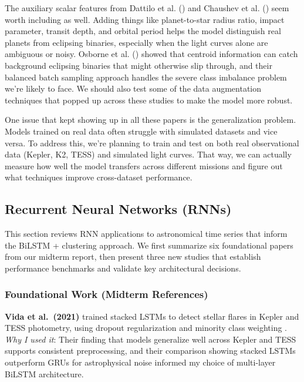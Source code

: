 \documentclass[letterpaper]{article} %
\begin{document}
The auxiliary scalar features from Dattilo et al. (\citeyear{Dattilo2019identifyexoplanetsII}) and Chaushev et al. (\citeyear{Chaushev2019ngts}) seem worth including as well. Adding things like planet-to-star radius ratio, impact parameter, transit depth, and orbital period helps the model distinguish real planets from eclipsing binaries, especially when the light curves alone are ambiguous or noisy. Osborne et al. (\citeyear{Osborn2019rapidclassificationtesscandidates}) showed that centroid information can catch background eclipsing binaries that might otherwise slip through, and their balanced batch sampling approach handles the severe class imbalance problem we're likely to face. We should also test some of the data augmentation techniques that popped up across these studies to make the model more robust.

One issue that kept showing up in all these papers is the generalization problem. Models trained on real data often struggle with simulated datasets and vice versa. To address this, we're planning to train and test on both real observational data (Kepler, K2, TESS) and simulated light curves. That way, we can actually measure how well the model transfers across different missions and figure out what techniques improve cross-dataset performance.

\subsection{Recurrent Neural Networks (RNNs)}

This section reviews RNN applications to astronomical time series that inform the BiLSTM + clustering approach. We first summarize six foundational papers from our midterm report, then present three new studies that establish performance benchmarks and validate key architectural decisions.

\subsubsection{Foundational Work (Midterm References)}

\textbf{Vida et al.\ (2021)} trained stacked LSTMs to detect stellar flares in Kepler and TESS photometry, using dropout regularization and minority class weighting \cite{Vida2021findingflaresrecurrent}. \textit{Why I used it}: Their finding that models generalize well across Kepler and TESS supports consistent preprocessing, and their comparison showing stacked LSTMs outperform GRUs for astrophysical noise informed my choice of multi-layer BiLSTM architecture.
\end{document}
